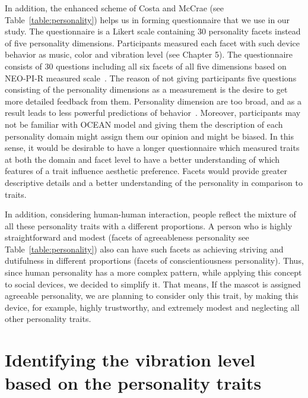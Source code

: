 In addition, the enhanced scheme of Costa and McCrae (see Table~\ref{table:personality})
helps us in forming questionnaire that we use in our study.
The questionnaire is a Likert scale containing 30 personality facets instead of five personality dimensions.
Participants measured each facet with such device behavior as music, color and vibration level (see Chapter 5).
The questionnaire consists of 30 questions including all six facets of
all five dimensions based on NEO-PI-R measured scale~\cite{costa2008revised}.
The reason of not giving participants five questions consisting of the personality
dimensions as a measurement is the desire to get more detailed feedback from them.
Personality dimension are too broad, and as a result leads to less powerful predictions of behavior~\cite{paunonen2001big}.
Moreover, participants may not be familiar with OCEAN model and giving them the description
of each personality domain might assign them our opinion and might be biased.
In this sense, it would be desirable to have a longer questionnaire which measured traits at both the
domain and facet level to have a better understanding of which features of a trait influence aesthetic preference.
Facets would provide greater descriptive details and a better understanding of the personality in comparison to traits.

In addition, considering human-human interaction, people reflect the mixture of all
these personality traits with a different proportions.
A person who is highly straightforward and modest (facets of agreeableness personality
see Table~\ref{table:personality}) also can have such facets as achieving striving and dutifulness
in different proportions (facets of conscientiousness personality).
Thus, since human personality has a more complex pattern, while
applying this concept to social devices, we decided to simplify it.
That means, If the mascot is assigned agreeable personality, we are planning to consider only this trait,
by making this device, for example, highly trustworthy, and extremely modest and neglecting all other personality traits.

\section{Identifying the vibration level based on the personality traits} 
\label{sec:Identifying the vibration level based on the personality traits}

